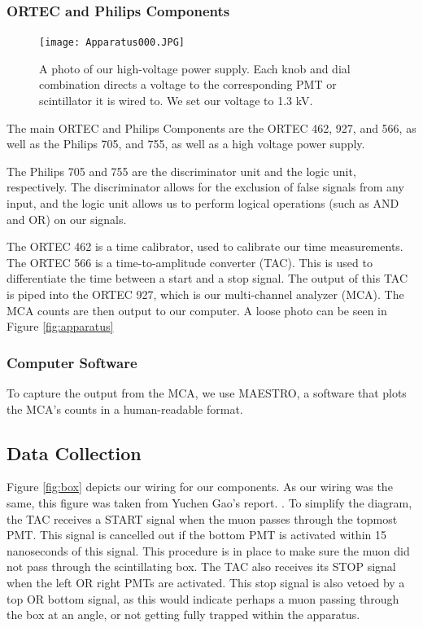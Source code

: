 \documentclass[10pt,letterpaper,onecolumn]{article}
\begin{document}
\subsubsection{ORTEC and Philips Components}
\begin{figure}[hbt!]
    \begin{center}
        {{\texttt{[image: Apparatus000.JPG]} }}%
        \caption{A photo of our high-voltage power supply. Each knob and dial combination directs a voltage to the corresponding PMT or scintillator it is wired to. We set our voltage to 1.3 kV.}%
        \label{fig:psu}%
    \end{center}
\end{figure}
The main ORTEC and Philips Components are the ORTEC 462, 927, and 566, as well as the Philips 705, and 755, as well as a high voltage power supply.

The Philips 705 and 755 are the discriminator unit and the logic unit, respectively. The discriminator allows for the exclusion of false signals from any input, and the logic unit allows us to perform logical operations (such as AND and OR) on our signals.

The ORTEC 462 is a time calibrator, used to calibrate our time measurements. The ORTEC 566 is a time-to-amplitude converter (TAC). This is used to differentiate the time between a start and a stop signal. The output of this TAC is piped into the ORTEC 927, which is our multi-channel analyzer (MCA). The MCA counts are then output to our computer. A loose photo can be seen in Figure \ref{fig:apparatus}
\subsubsection{Computer Software}
To capture the output from the MCA, we use MAESTRO, a software that plots the MCA's counts in a human-readable format. 
\subsection{Data Collection}
Figure \ref{fig:box} depicts our wiring for our components. As our wiring was the same, this figure was taken from Yuchen Gao's report. \cite{gao2018measurement}. To simplify the diagram, the TAC receives a START signal when the muon passes through the topmost PMT. This signal is cancelled out if the bottom PMT is activated within 15 nanoseconds of this signal. This procedure is in place to make sure the muon did not pass through the scintillating box. The TAC also receives its STOP signal when the left OR right PMTs are activated. This stop signal is also vetoed by a top OR bottom signal, as this would indicate perhaps a muon passing through the box at an angle, or not getting fully trapped within the apparatus.
\end{document}
